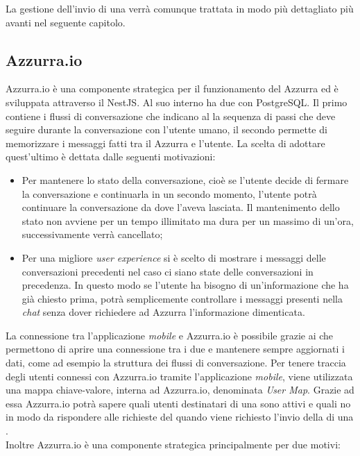 \begin{trivlist}
	La gestione dell'invio di una  verrà comunque trattata in modo più dettagliato più avanti nel seguente capitolo.
	\item \subsection{Azzurra.io}
	Azzurra.io è una componente strategica per il funzionamento del  Azzurra ed è sviluppata attraverso il  NestJS. Al suo interno ha due  con  PostgreSQL. Il primo contiene i flussi di conversazione che indicano al  la sequenza di passi che deve seguire durante la conversazione con l'utente umano, il secondo permette di memorizzare i messaggi fatti tra il  Azzurra e l'utente. La scelta di adottare quest'ultimo  è dettata dalle seguenti motivazioni:
	\begin{itemize}
		\item Per mantenere lo stato della conversazione, cioè se l'utente decide di fermare la conversazione e continuarla in un secondo momento, l'utente potrà continuare la conversazione da dove l'aveva lasciata. Il mantenimento dello stato non avviene per un tempo illimitato ma dura per un massimo di un'ora, successivamente verrà cancellato;
		\item Per una migliore \emph{user experience} si è scelto  di mostrare i messaggi delle conversazioni precedenti nel caso ci siano state delle conversazioni in precedenza. In questo modo se l'utente ha bisogno di un’informazione che ha già chiesto prima, potrà semplicemente controllare i messaggi presenti nella \emph{chat} senza dover richiedere ad Azzurra l'informazione dimenticata.
	\end{itemize}
	La connessione tra l'applicazione \emph{mobile} e Azzurra.io è possibile grazie ai  che permettono di aprire una connessione tra i due e mantenere sempre aggiornati i dati, come ad esempio la struttura dei flussi di conversazione. Per tenere traccia degli utenti connessi con Azzurra.io tramite l'applicazione \emph{mobile}, viene utilizzata una mappa chiave-valore, interna ad Azzurra.io, denominata \emph{User Map}. Grazie ad essa Azzurra.io potrà sapere quali utenti destinatari di una  sono attivi e quali no in modo da rispondere alle richieste del  quando viene richiesto l'invio della di una . \\
	Inoltre Azzurra.io è una componente strategica principalmente per due motivi:
	\begin{itemize}

\end{itemize}
\end{trivlist}
